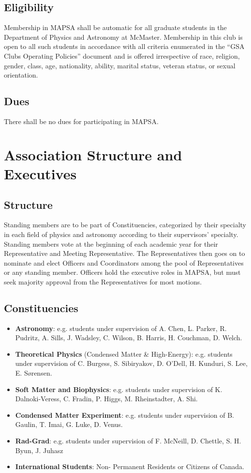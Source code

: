 \documentclass[11pt]{article}
\begin{document}
	\subsection{Eligibility}
	Membership in MAPSA shall be automatic for all graduate students in the Department of Physics and Astronomy at McMaster. Membership in this club is open to all such students in accordance with all criteria enumerated in the ``GSA Clubs Operating Policies'' document and is offered irrespective of race, religion, gender, class, age, nationality, ability, marital status, veteran status, or sexual orientation.
	
	\subsection{Dues}
	There shall be no dues for participating in MAPSA.
	
	\section{Association Structure and Executives}
	\subsection{Structure}
	Standing members are to be part of Constituencies, categorized by their specialty in each field of physics and astronomy according to their supervisors' specialty. Standing members vote at the beginning of each academic year for their Representative and Meeting Representative. The Representatives then goes on to nominate and elect Officers and Coordinators among the pool of Representatives or any standing member. Officers hold the executive roles in MAPSA, but must seek majority approval from the Representatives for most motions. 
	\subsection{Constituencies}
	\begin{itemize}
		\item \textbf{Astronomy}: e.g. students under supervision of A. Chen, L. Parker, R. Pudritz, A. Sills, J. Wadsley, C. Wilson, B. Harris, H. Couchman, D. Welch.
		\item \textbf{Theoretical Physics} (Condensed Matter \& High-Energy): e.g. students under supervision of C. Burgess, S. Sibiryakov, D. O'Dell, H. Kunduri, S. Lee, E. Sørensen.
		\item \textbf{Soft Matter and Biophysics}: e.g. students under supervision of K. Dalnoki-Veress, C. Fradin, P. Higgs, M. Rheinstadter, A. Shi.
		\item \textbf{Condensed Matter Experiment}: e.g. students under supervision of B. Gaulin, T. Imai, G. Luke, D. Venus.
		\item \textbf{Rad-Grad}: e.g. students under supervision of F. McNeill, D. Chettle, S. H. Byun, J. Juhasz
		\item \textbf{International Students}: Non- Permanent Residents or Citizens of Canada.
	\end{itemize}
	
\end{document}

